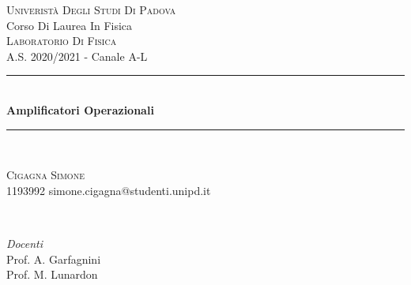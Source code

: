 \documentclass[a4paper,11pt]{article}
\begin{document}
\begin{titlepage}
	\newcommand{\HRule}{\rule{\linewidth}{0.5mm}} %

	\center %


	\textsc{\LARGE Univeristà Degli Studi Di Padova}\\[1.5cm] %

	\Large Corso Di Laurea In Fisica\\[0.5cm] %

	\textsc{\large Laboratorio Di Fisica}\\
    A.S. 2020/2021 - Canale A-L \\[0.5cm] %


	\HRule\\[0.4cm]

	{\huge\bfseries Amplificatori Operazionali}\\[0.4cm] %

	\HRule\\[1.5cm]


	\begin{minipage}{0.4\textwidth}
		\begin{flushleft}
			\large
			\textsc{Cigagna Simone}\\
			\textsc{1193992} %
			simone.cigagna@studenti.unipd.it %
		\end{flushleft}
	\end{minipage}
	~
	\begin{minipage}{0.4\textwidth}
		\begin{flushright}
			\large
			\textit{Docenti}\\
			Prof. A. Garfagnini\\
			Prof. M. Lunardon
		\end{flushright}
	\end{minipage}


\end{titlepage}
\end{document}
